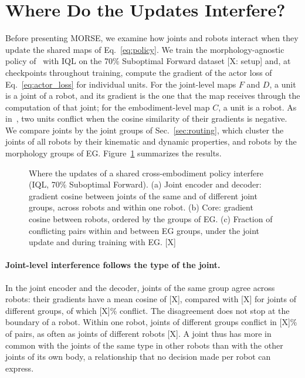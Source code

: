\section{Where Do the Updates Interfere?}
\label{sec:where}

Before presenting MORSE, we examine how joints and robots interact when they update the shared maps of
Eq.~\eqref{eq:policy}. We train the morphology-agnostic policy of~\citet{bohlinger2024onepolicy} with IQL on the 70\%
Suboptimal Forward dataset [X: setup] and, at checkpoints throughout training, compute the gradient of the actor loss
of Eq.~\eqref{eq:actor_loss} for individual units. For the joint-level maps $F$ and $D$, a unit is a joint of a robot,
and its gradient is the one that the map receives through the computation of that joint; for the embodiment-level map
$C$, a unit is a robot. As in~\citep{yu2020pcgrad,abe2026crossembodimentoffline}, two units conflict when the cosine
similarity of their gradients is negative. We compare joints by the joint groups of Sec.~\ref{sec:routing}, which
cluster the joints of all robots by their kinematic and dynamic properties, and robots by the morphology groups of EG.
Figure~\ref{fig:where} summarizes the results.

\begin{figure}[t]
\centering
\fbox{\rule{0pt}{1.5in}\rule{0.95\textwidth}{0pt}}
\caption{Where the updates of a shared cross-embodiment policy interfere (IQL, 70\% Suboptimal Forward).
(a) Joint encoder and decoder: gradient cosine between joints of the same and of different joint groups, across robots
and within one robot. (b) Core: gradient cosine between robots, ordered by the groups of EG. (c) Fraction of
conflicting pairs within and between EG groups, under the joint update and during training with EG. [X]}
\label{fig:where}
\end{figure}

\paragraph{Joint-level interference follows the type of the joint.}
In the joint encoder and the decoder, joints of the same group agree across robots: their gradients have a mean
cosine of [X], compared with [X] for joints of different groups, of which [X]\% conflict. The disagreement does not
stop at the boundary of a robot. Within one robot, joints of different groups conflict in [X]\% of pairs, as often as
joints of different robots [X]. A joint thus has more in common with the joints of the same type in other robots than
with the other joints of its own body, a relationship that no decision made per robot can express.

